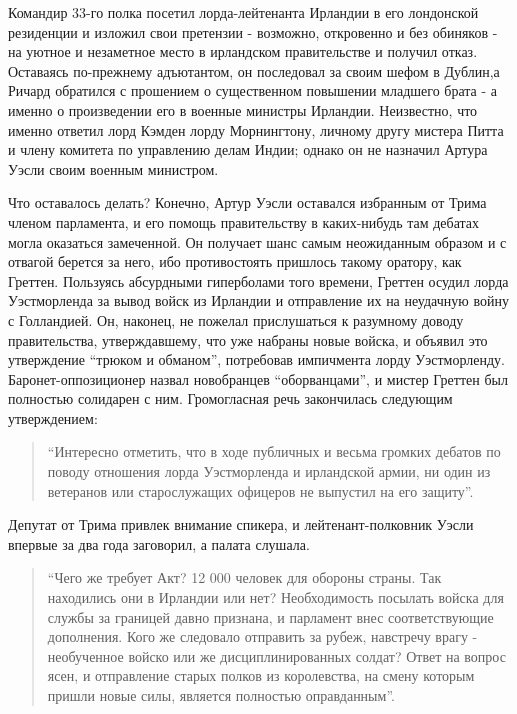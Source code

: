 \documentclass[
  oneside,
  12pt,
  titlepage]{book}
\begin{document}
Командир 33-го полка посетил лорда-лейтенанта Ирландии в его лондонской резиденции и изложил свои претензии - возможно, откровенно и без обиняков - на уютное и незаметное место в ирландском правительстве и получил отказ. Оставаясь по-прежнему адъютантом, он последовал за своим шефом в Дублин,а Ричард обратился с прошением о существенном повышении младшего брата - а именно о произведении его в военные министры Ирландии. Неизвестно, что именно ответил лорд Кэмден лорду Морнингтону, личному другу мистера Питта и члену комитета по управлению делам Индии; однако он не назначил Артура Уэсли своим военным министром.

Что оставалось делать? Конечно, Артур Уэсли оставался избранным от Трима членом парламента, и его помощь правительству в каких-нибудь там дебатах могла оказаться замеченной. Он получает шанс самым неожиданным образом и с отвагой берется за него, ибо противостоять пришлось такому оратору, как Греттен. Пользуясь абсурдными гиперболами того времени, Греттен осудил лорда Уэстморленда за вывод войск из Ирландии и отправление их на неудачную войну с Голландией. Он, наконец, не пожелал прислушаться к разумному доводу правительства, утверждавшему, что уже набраны новые войска, и объявил это утверждение ``трюком и обманом'', потребовав импичмента лорду Уэстморленду. Баронет-оппозиционер назвал новобранцев ``оборванцами'', и мистер Греттен был полностью солидарен с ним. Громогласная речь закончилась следующим утверждением:

\begin{quote}
``Интересно отметить, что в ходе публичных и весьма громких дебатов по поводу отношения лорда Уэстморленда и ирландской армии, ни один из ветеранов или старослужащих офицеров не выпустил на его защиту''.
\end{quote}

Депутат от Трима привлек внимание спикера, и лейтенант-полковник Уэсли впервые за два года заговорил, а палата слушала.

\begin{quote}
``Чего же требует Акт? 12 000 человек для обороны страны. Так находились они в Ирландии или нет? Необходимость посылать войска для службы за границей давно признана, и парламент внес соответствующие дополнения. Кого же следовало отправить за рубеж, навстречу врагу - необученное войско или же дисциплинированных солдат? Ответ на вопрос ясен, и отправление старых полков из королевства, на смену которым пришли новые силы, является полностью оправданным''.
\end{quote}
\end{document}

